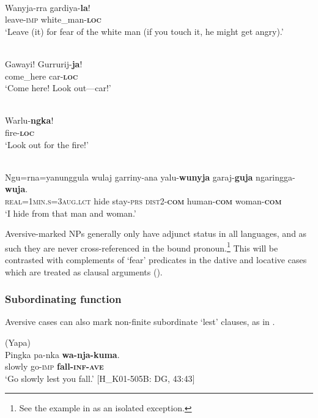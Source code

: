 \documentclass[output=paper,colorlinks,citecolor=brown]{langscibook}
\begin{document}
\ea
{} {\citealt[58]{tsunoda_djaru_1981}} \\
\gll Wanyja-rra gardiya-\textbf{la}! \\
leave-\textsc{imp} white\_man-\textbf{\textsc{loc}} \\
\glt `Leave (it) for fear of the white man (if you touch it, he might get angry).' 
\label{ex:bro18}
\z

\ea
{} {\citealt[129]{meakins_grammar_2014}} \\
\gll Gawayi! Gurrurij-\textbf{ja}! \\
come\_here car-\textbf{\textsc{loc}}\\
\glt `Come here! Look out---car!'
\label{ex:bro19}
\z

\ea
{} \\
\gll Warlu-\textbf{ngka}! \\
fire-\textbf{\textsc{loc}} \\
\glt `Look out for the fire!'
\label{ex:bro20}
\z

\ea
{} {\citealt[200]{senge_grammar_2015}} \\
\gll Ngu=rna=yanunggula wulaj garriny-ana yalu-\textbf{wunyja} garaj-\textbf{guja} ngaringga-\textbf{wuja}. \\
\textsc{real=1min.s=3aug.lct} hide stay-\textsc{prs} \textsc{dist2-\textbf{com}} human-\textbf{\textsc{com}} woman-\textbf{\textsc{com}} \\
\glt `I hide from that man and woman.'
\label{ex:bro21}
\z

 Aversive-marked NPs generally only have adjunct status in all  languages, and as such they are never cross-referenced in the bound pronoun.\footnote{See the  example in  as an isolated exception.} This will be contrasted with complements of `fear' predicates in the dative and locative cases which are treated as clausal arguments ().

\subsubsection{Subordinating function}
\label{subsubsec:subordinating}

Aversive cases can also mark non-finite subordinate `lest' clauses, as in .

\ea 
\textnormal{ (Yapa)} \\
\gll Pingka pa-nka \textbf{wa-nja-kuma}. \\
slowly go-\textsc{imp} \textbf{fall-\textsc{inf-ave}} \\
\glt `Go slowly lest you fall.' $[$H\_K01-505B: DG, 43:43$]$
\label{ex:bro22}
\z
\end{document}
